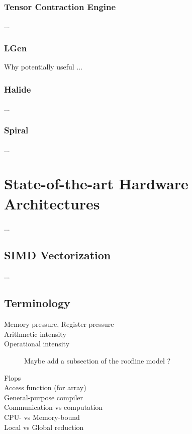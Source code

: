 \subsubsection{Tensor Contraction Engine}
...

\subsubsection{LGen}
Why potentially useful ...

\subsubsection{Halide}
...

\subsubsection{Spiral}
...

\section{State-of-the-art Hardware Architectures}
\label{sec:bkg:arch}
...

\subsection{SIMD Vectorization}
...

\subsection{Terminology}
\label{sec:bkg:terminology}

\begin{description}
\item[Memory pressure, Register pressure]
\item[Arithmetic intensity]
\item[Operational intensity] Maybe add a subsection of the roofline model ?
\item[Flops]
\item[Access function (for array)]
\item[General-purpose compiler]
\item[Communication vs computation]
\item[CPU- vs Memory-bound]
\item[Local vs Global reduction]
\end{description}
